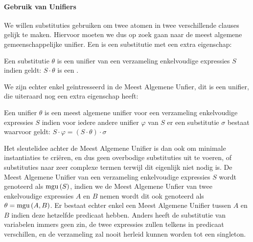 \paragraph{Gebruik van Unifiers}
We willen substituties gebruiken om twee atomen in twee verschillende clauses gelijk te maken. Hiervoor moeten we dus op zoek gaan naar de meest algemene gemeenschappelijke unifier. Een  is een substitutie met een extra eigenschap:
\begin{theorem}
Een substitutie $\theta$ is een unifier van een verzameling enkelvoudige expressies $S$ indien geldt: $S\cdot\theta$ is een .
\end{theorem}
We zijn echter enkel ge\"intresseerd in de Meest Algemene Unfier, dit is een unifier, die uiteraard nog een extra eigenschap heeft:
\begin{theorem}
Een unifier $\theta$ is een meest algemene unifier voor een verzameling enkelvoudige expressies $S$ indien voor iedere andere unifier $\varphi$ van $S$ er een substitutie $\sigma$ bestaat waarvoor geldt: $S\cdot\varphi=\left(S\cdot\theta\right)\cdot\sigma$
\end{theorem}
Het sleutelidee achter de Meest Algemene Unifier is dan ook om minimale instantiaties te cri\"eren, en dus geen overbodige substituties uit te voeren, of substituties naar zeer complexe termen terwijl dit eigenlijk niet nodig is. De Meest Algemene Unifier van een verzameling enkelvoudige expressies $S$ wordt genoteerd als $\mbox{mgu}\left( S \right)$, indien we de Meest Algemene Unfier van twee enkelvoudige expressies $A$ en $B$ nemen wordt dit ook genoteerd als $\theta=\mbox{mgu}\left( A,B \right)$. Er bestaat echter enkel een Meest Algemene Unifier tussen $A$ en $B$ indien deze hetzelfde predicaat hebben. Anders heeft de substitutie van variabelen immers geen zin, de twee expressies zullen telkens in predicaat verschillen, en de verzameling zal nooit herleid kunnen worden tot een singleton.
